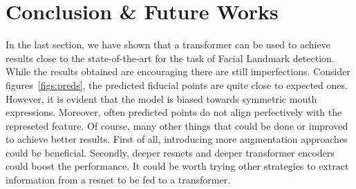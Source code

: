 \section{Conclusion \& Future Works}\label{sects:future}

In the last section, we have shown that a transformer can be used to achieve results close to the state-of-the-art for the task of Facial Landmark detection. While the results obtained are encouraging there are still imperfections. Consider figures~\ref{figs:preds}, the predicted fiducial points are quite close to expected ones. However, it is evident that the model is biased towards symmetric mouth expressions. Moreover, often predicted points do not align perfectively with the represeted feature. Of course, many other things that could be done or improved to achieve better results. First of all, introducing more augmentation approaches could be beneficial. Secondly, deeper resnets and deeper transformer encoders could boost the performance. It could be worth trying other strategies to extract information from a resnet to be fed to a transformer.
